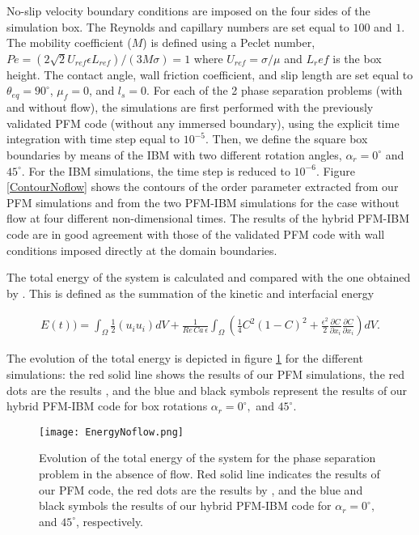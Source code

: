 \documentclass[review]{elsarticle}
\begin{document}
No-slip velocity boundary conditions are imposed on the four sides of the simulation box. The Reynolds and capillary numbers are set equal to $100$ and $1$. 
The mobility coefficient ($M$) is defined using a Peclet number, $Pe=(2\sqrt 2 U_{ref}\epsilon L_{ref})/(3 M \sigma)=1$ where $U_{ref}=\sigma/\mu$ and $L_ref$ is the box height. 
The contact angle, wall friction coefficient, and slip length are set equal to $\theta_{eq}=90^\circ$, $\mu_f=0$, and $l_s=0$. 
For each of the 2 phase separation problems (with and without flow), the simulations are first performed with the previously validated PFM code (without any immersed boundary), using the explicit time integration with time step equal to $10^{-5}$. Then, we define the square box boundaries by means of the IBM with two different rotation angles, $\alpha_r=0^\circ$ and $45^\circ$. For the IBM simulations, the time step is reduced to $10^{-6}$. Figure \ref{ContourNoflow} shows the contours of the order parameter extracted from our PFM simulations and from the two PFM-IBM simulations for the case without flow at four different non-dimensional times. 
The results of the hybrid PFM-IBM code are in good agreement with those of the validated PFM code with wall conditions imposed directly at the domain boundaries.


The total energy of the system is calculated and compared with the one obtained by \cite{Nishida2018}. This  is defined as the summation of the kinetic and interfacial energy 
\begin{linenomath}\begin{equation} \label{TotalEnergy}
\begin{gathered}
 E(t)) = \int_{\Omega} \frac{1}{2} \left( {u_i}{u_i}\right)dV + \frac{1}{Re \, Ca \,\epsilon}\int_{\Omega} \left(\frac{1}{4}C^2{(1-C)}^2 + \frac{\epsilon^2}{2} \frac{\partial C}{\partial x_i} \frac{\partial C}{\partial x_i}\right)dV.
 \end{gathered}
\end{equation}\end{linenomath}

The evolution of the total energy is depicted in figure \ref{TotalEnergynoFlow} for the different simulations: the red solid line shows the results of our PFM simulations, the red dots are the results \cite{Nishida2018}, and the blue and black symbols represent the results of our hybrid PFM-IBM code for box rotations $\alpha_r=0^\circ,$ and $45^\circ$.
\begin{figure} [H]
\centering
\texttt{[image: EnergyNoflow.png]}
\caption{Evolution of the total energy of the system for the phase separation problem in the absence of flow. Red solid line indicates the results of our PFM code, the red dots are the results by \cite{Nishida2018}, and the blue and black symbols the results of our hybrid PFM-IBM code for $\alpha_r=0^\circ,$ and $45^\circ$, respectively. }
\label{TotalEnergynoFlow}
\end{figure}
\end{document}
